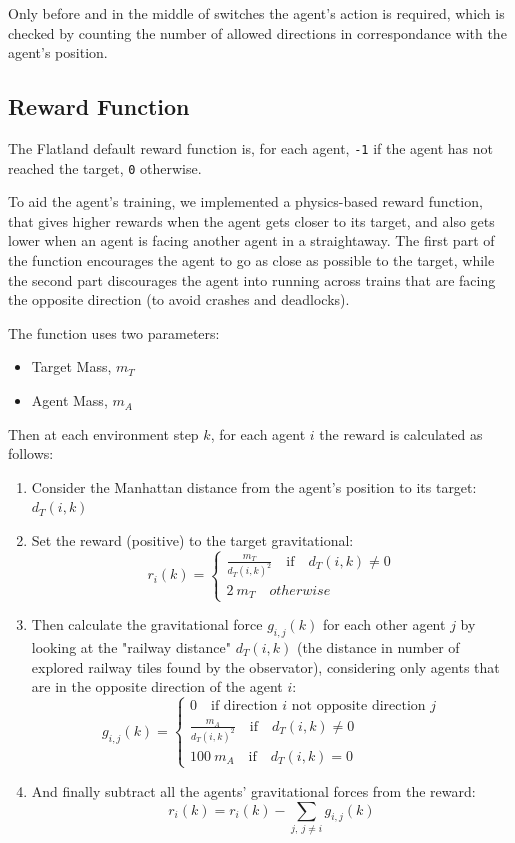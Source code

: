 \documentclass[13pt]{article}
\begin{document}
Only before and in the middle of switches the agent's action is required, which is checked by counting the number of allowed directions in correspondance with the agent's position.

\subsection{Reward Function}
The Flatland default reward function is, for each agent, \texttt{-1} if the agent has not reached the target, \texttt{0} otherwise.

To aid the agent's training, we implemented a physics-based reward function, that gives higher rewards when the agent gets closer to its target, and also gets lower when an agent is facing another agent in a straightaway. The first part of the function encourages the agent to go as close as possible to the target, while the second part discourages the agent into running across trains that are facing the opposite direction (to avoid crashes and deadlocks).

The function uses two parameters:
\begin{itemize}
    \item[] Target Mass, $m_T$
    \item[] Agent Mass, $m_A$
\end{itemize}

Then at each environment step $k$, for each agent $i$ the reward is calculated as follows:
\begin{enumerate}
    \item Consider the Manhattan distance from the agent's position to its target: $d_{T}(i, k)$
    \item Set the reward (positive) to the target gravitational:
    \begin{equation*}
        r_i(k) = \begin{cases}
            \frac{m_T}{{d_{T}(i, k)}^2} \quad \text{if} \quad d_{T}(i, k) \neq 0 \\
            2 \ m_{T} \quad otherwise
        \end{cases}
    \end{equation*}
    \item Then calculate the gravitational force $g_{i,j}(k)$ for each other agent $j$ by looking at the "railway distance" $d_{T}(i, k)$ (the distance in number of explored railway tiles found by the observator), considering only agents that are in the opposite direction of the agent $i$:
    \begin{equation*}
        g_{i,j}(k) = \begin{cases}
        0 \quad \text{if direction $i$ not opposite direction $j$} \\
        \frac{m_A}{{d_{T}(i, k)}^2} \quad \text{if} \quad d_{T}(i, k) \neq 0 \\
        100 \ m_A \quad \text{if} \quad d_{T}(i, k) = 0
        \end{cases}
    \end{equation*}
    \item And finally subtract all the agents' gravitational forces from the reward:
    \[r_i(k) = r_i(k) - \sum_{j, \ j\neq i} g_{i,j}(k)\]
\end{enumerate}
\end{document}
